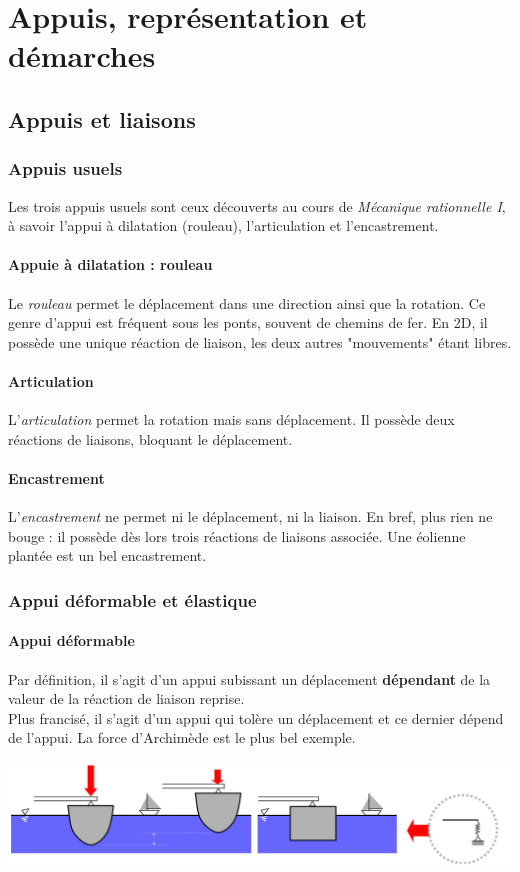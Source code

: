 \chapter{Appuis, représentation et démarches}
\section{Appuis et liaisons}
	\subsection{Appuis usuels}
	Les trois appuis usuels sont ceux découverts au cours de \textit{Mécanique 
	rationnelle I}, à savoir l'appui à dilatation (rouleau), l'articulation et 
	l'encastrement.
	
		\subsubsection{Appuie à dilatation : rouleau}
		Le \textit{rouleau} permet le déplacement dans une direction ainsi que 
		la rotation. Ce genre d'appui est fréquent sous les ponts, souvent de 
		chemins de fer. En 2D, il possède une unique réaction de liaison, les 
		deux autres "mouvements" étant libres.
		
		\subsubsection{Articulation}
		L'\textit{articulation} permet la rotation mais sans déplacement. Il 
		possède deux réactions de liaisons, bloquant le déplacement.
		
		\subsubsection{Encastrement}
		L'\textit{encastrement} ne permet ni le déplacement, ni la liaison. En 
		bref, plus rien ne bouge : il possède dès lors trois réactions de 
		liaisons associée. Une éolienne plantée est un bel encastrement.
	
	\subsection{Appui déformable et élastique}
		\subsubsection{Appui déformable}
		Par définition, il s'agit d'un appui subissant un déplacement 
		\textbf{dépendant} 	de la valeur de la réaction de liaison reprise. \\
		Plus francisé, il s'agit d'un appui qui tolère un déplacement et 
		ce dernier dépend de l'appui. La force d'Archimède est le plus bel 
		exemple.
		\begin{center}
		\includegraphics[scale=0.26]{ch2/image4}
		\end{center}\newpage

